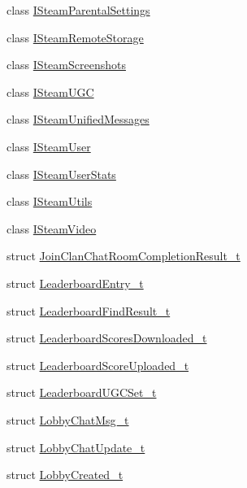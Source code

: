 \begin{DoxyCompactItemize}
\item 
class \hyperlink{class_valve_1_1_steamworks_1_1_i_steam_parental_settings}{I\+Steam\+Parental\+Settings}
\item 
class \hyperlink{class_valve_1_1_steamworks_1_1_i_steam_remote_storage}{I\+Steam\+Remote\+Storage}
\item 
class \hyperlink{class_valve_1_1_steamworks_1_1_i_steam_screenshots}{I\+Steam\+Screenshots}
\item 
class \hyperlink{class_valve_1_1_steamworks_1_1_i_steam_u_g_c}{I\+Steam\+U\+GC}
\item 
class \hyperlink{class_valve_1_1_steamworks_1_1_i_steam_unified_messages}{I\+Steam\+Unified\+Messages}
\item 
class \hyperlink{class_valve_1_1_steamworks_1_1_i_steam_user}{I\+Steam\+User}
\item 
class \hyperlink{class_valve_1_1_steamworks_1_1_i_steam_user_stats}{I\+Steam\+User\+Stats}
\item 
class \hyperlink{class_valve_1_1_steamworks_1_1_i_steam_utils}{I\+Steam\+Utils}
\item 
class \hyperlink{class_valve_1_1_steamworks_1_1_i_steam_video}{I\+Steam\+Video}
\item 
struct \hyperlink{struct_valve_1_1_steamworks_1_1_join_clan_chat_room_completion_result__t}{Join\+Clan\+Chat\+Room\+Completion\+Result\+\_\+t}
\item 
struct \hyperlink{struct_valve_1_1_steamworks_1_1_leaderboard_entry__t}{Leaderboard\+Entry\+\_\+t}
\item 
struct \hyperlink{struct_valve_1_1_steamworks_1_1_leaderboard_find_result__t}{Leaderboard\+Find\+Result\+\_\+t}
\item 
struct \hyperlink{struct_valve_1_1_steamworks_1_1_leaderboard_scores_downloaded__t}{Leaderboard\+Scores\+Downloaded\+\_\+t}
\item 
struct \hyperlink{struct_valve_1_1_steamworks_1_1_leaderboard_score_uploaded__t}{Leaderboard\+Score\+Uploaded\+\_\+t}
\item 
struct \hyperlink{struct_valve_1_1_steamworks_1_1_leaderboard_u_g_c_set__t}{Leaderboard\+U\+G\+C\+Set\+\_\+t}
\item 
struct \hyperlink{struct_valve_1_1_steamworks_1_1_lobby_chat_msg__t}{Lobby\+Chat\+Msg\+\_\+t}
\item 
struct \hyperlink{struct_valve_1_1_steamworks_1_1_lobby_chat_update__t}{Lobby\+Chat\+Update\+\_\+t}
\item 
struct \hyperlink{struct_valve_1_1_steamworks_1_1_lobby_created__t}{Lobby\+Created\+\_\+t}

\end{DoxyCompactItemize}
